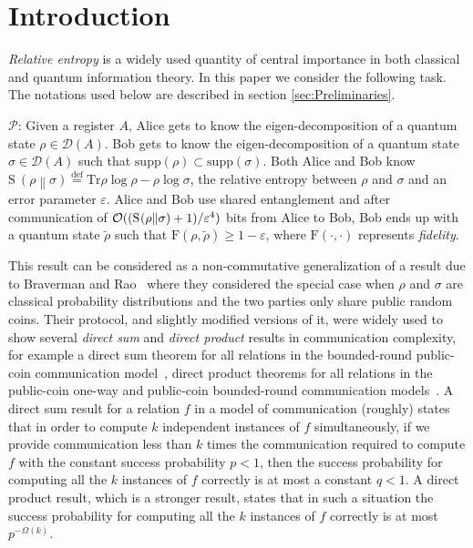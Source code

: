 \documentclass[11pt,a4paper]{article}
\def\F{\mathrn{F}}
\def\O{\CMcal{O}}
\theoremstyle{plain}
\theoremstyle{definition}
\newcommand {\br} [1] {\ensuremath{ \left( #1 \right) }}
\newcommand {\minusspace} {\: \! \!}
\newcommand {\fn} [2] {\ensuremath{ #1 \minusspace \br{ #2 } }}
\newcommand {\defeq} {\ensuremath{ \stackrel{\mathrm{def}}{=} }}
\newcommand {\relent} [2] {\fn{\mathrm{S}}{#1 \middle\| #2}}
\newcommand {\Tr} {\ensuremath{ \mathrm{Tr} }}
\newcommand {\Prot}{\mathcal{P}}
\def\ve{{\varepsilon}}
\def\F{\mathrm{F}}
\begin{document}
\section{Introduction}

{\em Relative entropy} is a widely used quantity of central importance in both classical and quantum information theory. In this paper we consider the following task. The notations used below are described in section \ref{sec:Preliminaries}.

\bigskip

\noindent $\Prot$: Given a register $A$, Alice gets to know the eigen-decomposition of a quantum state $\rho \in \mathcal{D}(A)$. Bob gets to know the eigen-decomposition of a quantum state $\sigma\in \mathcal{D}(A)$ such that $\text{supp}(\rho) \subset \text{supp}(\sigma)$. Both Alice and Bob know $ \relent{\rho}{\sigma} \defeq \Tr \rho \log \rho - \rho \log \sigma$, the relative entropy between $\rho$ and $\sigma$ and an error parameter $\ve$. Alice and Bob use shared entanglement and after communication of $\O((\relent{\rho}{\sigma}+1)/\ve^4)$ bits from Alice to Bob, Bob ends up with a quantum state $\tilde{\rho}$ such that $\F(\rho, \tilde{\rho}) \geq 1 - \ve$, where $\F(\cdot,\cdot)$ represents {\em fidelity}.

\bigskip 

This result can be considered as a non-commutative generalization of a result due to Braverman and Rao~\cite{Braverman2011} where they considered the special case when $\rho$ and $\sigma$ are classical probability distributions and the two parties only share public random coins. Their protocol, and slightly modified versions of it, were widely used to show several {\em direct sum} and {\em direct product} results in communication complexity, for example a direct sum theorem for all relations in the bounded-round public-coin communication model~\cite{Braverman2011}, direct product theorems for all relations in the public-coin one-way and public-coin bounded-round communication models~\cite{Jain:2011,Jain:2012,BravermanRWY:2013}.  A direct sum result for a relation $f$ in a model of communication  (roughly) states that in order to compute $k$ independent  instances of $f$ simultaneously, if we provide communication less than $k$ times the communication required to compute $f$ with the constant success probability $p<1$, then the success probability for computing all the $k$ instances of $f$ correctly is at most a constant $q<1$. A direct product result, which is a stronger result, states that in such a situation  the success probability for computing all the $k$ instances of $f$ correctly is at most $p^{-\Omega(k)}$.
\end{document}
